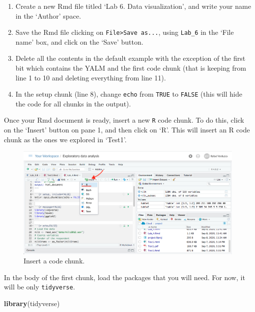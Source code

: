 \documentclass[
]{book}
\newenvironment{Shaded}{\begin{snugshade}}{\end{snugshade}}
\newcommand{\FunctionTok}[1]{\textcolor[rgb]{0.13,0.29,0.53}{\textbf{#1}}}
\newcommand{\NormalTok}[1]{#1}
\providecommand{\tightlist}{%
  \setlength{\itemsep}{0pt}\setlength{\parskip}{0pt}}
\begin{document}
\begin{enumerate}
\def\labelenumi{\arabic{enumi}.}
\tightlist
\item
  Create a new Rmd file titled `Lab 6. Data visualization', and write your name in the `Author' space.
\item
  Save the Rmd file clicking on \texttt{File\textgreater{}Save\ as...}, using \texttt{Lab\_6} in the `File name' box, and click on the `Save' button.
\item
  Delete all the contents in the default example with the exception of the first bit which contains the YALM and the first code chunk (that is keeping from line 1 to 10 and deleting everything from line 11).
\item
  In the setup chunk (line 8), change \texttt{echo} from \texttt{TRUE} to \texttt{FALSE} (this will hide the code for all chunks in the output).
\end{enumerate}

Once your Rmd document is ready, insert a new \texttt{R} code chunk. To do this, click on the `Insert' button on pane 1, and then click on `R'. This will insert an R code chunk as the ones we explored in `Test1'.

\begin{figure}

\includegraphics[width=1\linewidth]{./images/Lab4_chunk} \hfill{}

\caption{Insert a code chunk.}\label{fig:unnamed-chunk-62}
\end{figure}

In the body of the first chunk, load the packages that you will need. For now, it will be only \texttt{tidyverse}.

\begin{Shaded}
\begin{Highlighting}[]
\FunctionTok{library}\NormalTok{(tidyverse)}
\end{Highlighting}
\end{Shaded}
\end{document}
